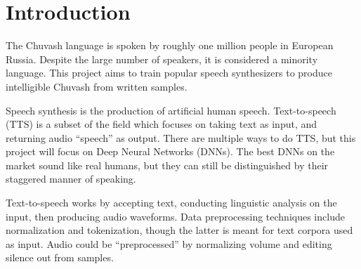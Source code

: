 \documentclass[fleqn,10pt]{SelfArx} %
\affiliation{\textsuperscript{†}\textit{Computer Science; School of Informatics, Computing and Engineering, Indiana University, Bloomington, IN, USA}} %
\begin{document}
	\flushbottom %
	\maketitle %
	\tableofcontents %
	\thispagestyle{empty} %
	
	
	
	
	
	
	\section{Introduction}
	The Chuvash language is spoken by roughly one million people in European Russia\cite{russianBureauStatistics}. Despite the large number of speakers, it is considered a minority language. This project aims to train popular speech synthesizers to produce intelligible Chuvash from written samples.
	
	Speech synthesis is the production of artificial human speech\cite{speechSynthesis}. Text-to-speech (TTS) is a subset of the field which focuses on taking text as input, and returning audio ``speech'' as output. There are multiple ways to do TTS, but this project will focus on Deep Neural Networks (DNNs). The best DNNs on the market sound like real humans, but they can still be distinguished by their staggered manner of speaking.
	
	Text-to-speech works by accepting text, conducting linguistic analysis on the input, then producing audio waveforms. Data preprocessing techniques include normalization and tokenization\cite{lexAnalysis}, though the latter is meant for text corpora used as input. Audio could be ``preprocessed'' by normalizing volume and editing silence out from samples.
	
\end{document}
